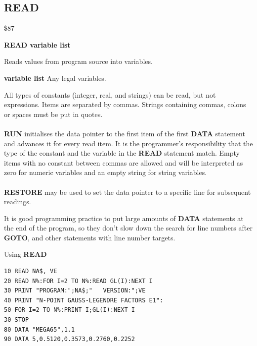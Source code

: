 \subsection{READ}
\begin{description}[leftmargin=2cm,style=nextline]
\item [Token:] \$87
\item [Format:] {\bf READ variable list}
\item [Usage:]  Reads values from program source into variables.

               {\bf variable list} Any legal variables.

               All types of constants (integer, real, and
               strings) can be read, but not expressions.
               Items are separated by commas.
               Strings containing commas, colons or spaces must be put
               in quotes. \\
               \\
               {\bf RUN} initialises the data pointer
               to the first item of the first {\bf DATA} statement
               and advances it for every read item. It is the
               programmer's responsibility that the type of
               the constant and the variable in the {\bf READ}
               statement match. Empty items with no constant
               between commas are allowed and will be interpreted as
               zero for numeric variables and an empty string for
               string variables. \\
               \\
               {\bf RESTORE} may be used to set the
               data pointer to a specific line for subsequent
               readings.

\item [Remarks:] It is good programming practice to put large amounts of
                 {\bf DATA} statements at the end of the program,
                 so they don't slow down the search for line numbers
                 after {\bf GOTO}, and other statements with line number targets.

\item [Example:] Using {\bf READ}
\begin{tcolorbox}[colback=black,coltext=white]
\verbatimfont{\codefont}
\begin{verbatim}
10 READ NA$, VE
20 READ N%:FOR I=2 TO N%:READ GL(I):NEXT I
30 PRINT "PROGRAM:";NA$;"   VERSION:";VE
40 PRINT "N-POINT GAUSS-LEGENDRE FACTORS E1":
50 FOR I=2 TO N%:PRINT I;GL(I):NEXT I
30 STOP
80 DATA "MEGA65",1.1
90 DATA 5,0.5120,0.3573,0.2760,0.2252
\end{verbatim}
\end{tcolorbox}
\end{description}

